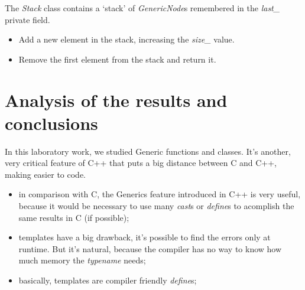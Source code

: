 \documentclass{article}
\begin{document}
		\par The \textit{Stack} class contains a `stack' of \textit{GenericNode}s remembered in the \textit{last\_} private field.

		\begin{itemize}
			\item
				\par {}
				\par Add a new element in the stack, increasing the \textit{size\_} value.

			\item
				\par {}
				\par Remove the first element from the stack and return it.
		\end{itemize}


	\section{Analysis of the results and conclusions}
		\par In this laboratory work, we studied Generic functions and classes. It's another, very critical feature of C++ that puts a big distance between C and C++, making easier to code.
		\begin{itemize}
			\item in comparison with C, the Generics feature introduced in C++ is very useful, because it would be necessary to use many \textit{cast}s or \textit{define}s to acomplish the same results in C (if possible);

			\item templates have a big drawback, it's possible to find the errors only at runtime. But it's natural, because the compiler has no way to know how much memory the \textit{typename} needs;

			\item basically, templates are compiler friendly \textit{define}s;
		\end{itemize}
\end{document}

